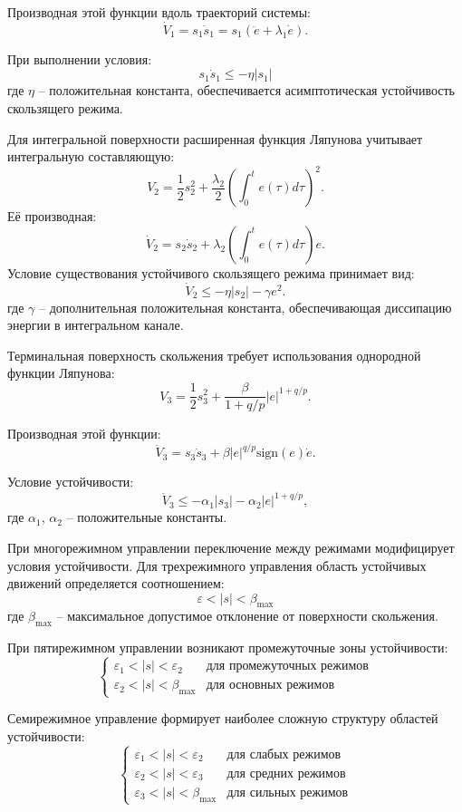 Производная этой функции вдоль траекторий системы:
$$
	\dot{V}_1 = s_1\dot{s}_1 = s_1(\ddot{e} + \lambda_1\dot{e}).
$$

При выполнении условия:
$$
	s_1\dot{s}_1 \leq -\eta|s_1|
$$
где $\eta$ -- положительная константа, обеспечивается асимптотическая устойчивость скользящего режима.

Для интегральной поверхности расширенная функция Ляпунова учитывает интегральную составляющую:
$$
	V_2 = \frac{1}{2}s_2^2 + \frac{\lambda_2}{2}\left(\int_0^t e(\tau)d\tau\right)^2.
$$
Её производная:
$$
	\dot{V}_2 = s_2\dot{s}_2 + \lambda_2\left(\int_0^t e(\tau)d\tau\right)e.
$$
Условие существования устойчивого скользящего режима принимает вид:
$$
	\dot{V}_2 \leq -\eta|s_2| - \gamma e^2.
$$
где $\gamma$ -- дополнительная положительная константа, обеспечивающая диссипацию энергии в интегральном канале.

Терминальная поверхность скольжения требует использования однородной функции Ляпунова:
$$
	V_3 = \frac{1}{2}s_3^2 + \frac{\beta}{1+q/p}|e|^{1+q/p}.
$$

Производная этой функции:
$$
	\dot{V}_3 = s_3\dot{s}_3 + \beta|e|^{q/p}\text{sign}(e)\dot{e}.
$$

Условие устойчивости:
$$
	\dot{V}_3 \leq -\alpha_1|s_3| - \alpha_2|e|^{1+q/p},
$$
где $\alpha_1$, $\alpha_2$ -- положительные константы.

При многорежимном управлении переключение между режимами модифицирует
условия устойчивости. Для трехрежимного управления
область устойчивых движений определяется соотношением:
$$
	\varepsilon < |s| < \beta_{\text{max}}
$$
где $\beta_{\text{max}}$ -- максимальное допустимое отклонение от поверхности скольжения.

При пятирежимном управлении возникают промежуточные зоны устойчивости:
$$
	\begin{cases}
		\varepsilon_1 < |s| < \varepsilon_2      & \text{для промежуточных режимов} \\
		\varepsilon_2 < |s| < \beta_{\text{max}} & \text{для основных режимов}
	\end{cases}
$$

Семирежимное управление формирует наиболее сложную структуру областей устойчивости:
$$
	\begin{cases}
		\varepsilon_1 < |s| < \varepsilon_2      & \text{для слабых режимов}  \\
		\varepsilon_2 < |s| < \varepsilon_3      & \text{для средних режимов} \\
		\varepsilon_3 < |s| < \beta_{\text{max}} & \text{для сильных режимов}
	\end{cases}
$$

